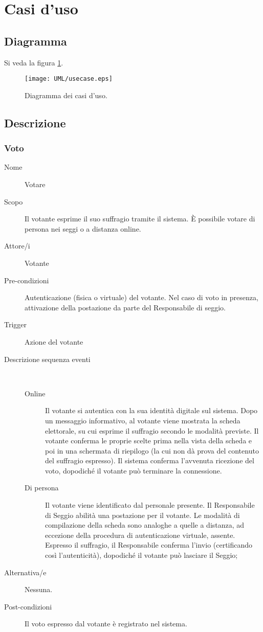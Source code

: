 \section{Casi d'uso}


\subsection{Diagramma}
Si veda la figura \ref{fig:usecasediag}.
\begin{figure}[ht]
	\texttt{[image: UML/usecase.eps]}
	\caption{Diagramma dei casi d'uso.}
	\label{fig:usecasediag}
\end{figure}


\subsection{Descrizione}

\subsubsection{Voto}
\begin{description}
	\item[Nome] Votare
	\item[Scopo] Il votante esprime il suo suffragio tramite il sistema. È possibile votare di persona nei seggi o a distanza online.
	\item[Attore/i] Votante
	\item[Pre-condizioni] Autenticazione (fisica o virtuale) del votante. Nel caso di voto in presenza, attivazione della postazione da parte del Responsabile di seggio.
	\item[Trigger] Azione del votante
	\item[Descrizione sequenza eventi] ~
		\begin{description}
			\item[Online] Il votante si autentica con la sua identità digitale sul sistema. Dopo un messaggio informativo, al votante viene mostrata la scheda elettorale, su cui esprime il suffragio secondo le modalità previste. Il votante conferma le proprie scelte prima nella vista della scheda e poi in una schermata di riepilogo (la cui non dà prova del contenuto del suffragio espresso). Il sistema conferma l'avvenuta ricezione del voto, dopodiché il votante può terminare la connessione.
			\item[Di persona] Il votante viene identificato dal personale presente. Il Responsabile di Seggio abilità una postazione per il votante. Le modalità di compilazione della scheda sono analoghe a quelle a distanza, ad eccezione della procedura di autenticazione virtuale, assente. Espresso il suffragio, il Responsabile conferma l'invio (certificando così l'autenticità), dopodiché il votante può lasciare il Seggio;
		\end{description}
	\item[Alternativa/e] Nessuna.
	\item[Post-condizioni] Il voto espresso dal votante è registrato nel sistema.
\end{description}

